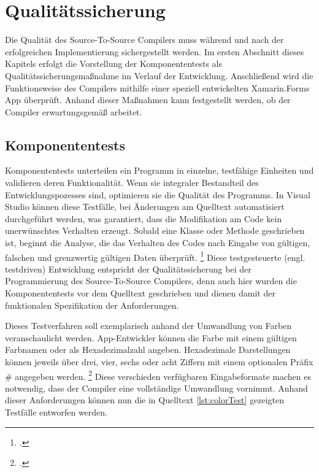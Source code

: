 \chapter{Qualitätssicherung}
\label{chap:Qualitätssicherung}
Die Qualität des Source-To-Source Compilers muss während und nach der erfolgreichen Implementierung sichergestellt werden.  Im ersten Abschnitt dieses Kapitels erfolgt die Vorstellung der Komponententests als Qualitätssicherungsmaßnahme im Verlauf der Entwicklung.  Anschließend wird die Funktionsweise des Compilers mithilfe einer speziell entwickelten Xamarin.Forms App überprüft.  Anhand dieser Maßnahmen kann  festgestellt werden,  ob der Compiler erwartungsgemäß arbeitet. 

\section{Komponententests}
Komponententests unterteilen ein Programm in einzelne,  testfähige Einheiten und validieren deren Funktionalität.  Wenn sie integraler Bestandteil des Entwicklungspozesses sind,  optimieren sie die Qualität des Programms.  In Visual Studio können diese Testfälle, bei Änderungen am Quelltext automatisiert durchgeführt 
werden, was garantiert, dass die Modifikation am Code kein unerwünschtes Verhalten erzeugt.   Sobald eine Klasse oder Methode geschrieben ist, beginnt die Analyse, die das Verhalten des Codes nach Eingabe von gültigen, falschen und grenzwertig gültigen Daten überprüft. \footcite[Vgl.][Abgerufen am \today]{MicrosoftColor}  Diese testgesteuerte (engl. testdriven) Entwicklung entspricht der Qualitätssicherung bei 
der Programmierung des Source-To-Source Compilers, denn auch hier wurden die Komponententests vor dem Quelltext geschrieben und dienen damit  der funktionalen Spezifikation der Anforderungen.

Dieses Testverfahren soll exemplarisch anhand der Umwandlung von Farben veranschaulicht 
werden.
App-Entwickler können die Farbe mit einem gültigen Farbnamen oder als Hexadezimalzahl 
angeben. Hexadezimale Darstellungen können jeweils über drei, vier, sechs oder acht Ziffern mit
einem optionalen Präfix \# angegeben werden.  \footcite[Vgl.][Abgerufen am \today]{MicrosoftColor} 
Diese verschieden verfügbaren Eingabeformate machen es notwendig, dass der Compiler eine 
vollständige Umwandlung vornimmt.  
Anhand dieser Anforderungen können nun die in Quelltext \ref{lst:colorTest} gezeigten Testfälle entworfen werden.



